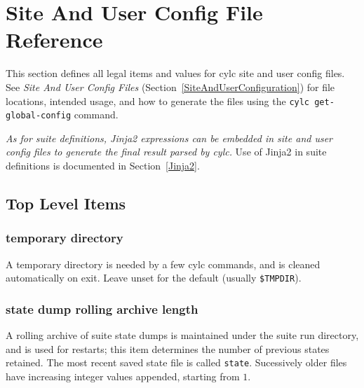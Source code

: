 
\section{Site And User Config File Reference}
\label{SiteRCReference}

\lstset{language=bash}

This section defines all legal items and values for cylc site and 
user config files. See {\em Site And User Config Files} 
(Section~\ref{SiteAndUserConfiguration}) for file locations, intended
usage, and how to generate the files using the
\lstinline=cylc get-global-config= command.

{\em As for suite definitions, Jinja2 expressions can be embedded in
site and user config files to generate the final result parsed by cylc.}
Use of Jinja2 in suite definitions is documented in
Section~\ref{Jinja2}.

\subsection{Top Level Items}

\subsubsection{temporary directory}

A temporary directory is needed by a few cylc commands, and is cleaned
automatically on exit. Leave unset for the default (usually
\lstinline=$TMPDIR=).


\subsubsection{state dump rolling archive length}

A rolling archive of suite state dumps is maintained under the suite run
directory, and is used for restarts; this item determines the number of
previous states retained. The most recent saved state file is called
\lstinline=state=. Sucessively older files have increasing integer
values appended, starting from $1$.


